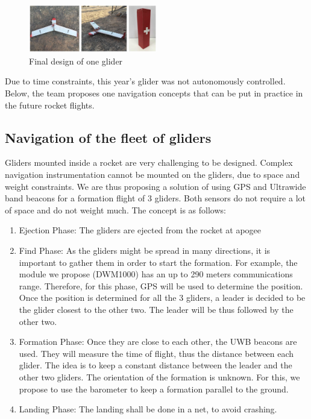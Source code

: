\begin{figure}[h!]
    \centering
        \includegraphics[width=0.5\textwidth]{img/final.jpg}
        \caption{Final design of one glider}
        \label{fig:final}
 \end{figure}

Due to time constraints, this year's glider was not autonomously controlled. Below, the team proposes one navigation concepts that can be put in practice in the future rocket flights.


\subsection{Navigation of the fleet of gliders}
\label{subsection:navcontrol}

Gliders mounted inside a rocket are very challenging to be designed. 
Complex navigation instrumentation cannot be mounted on the gliders, due to space and weight constraints. 
We are thus proposing a solution of using GPS and Ultrawide band beacons for a formation flight of 3 gliders. Both sensors do not require a lot of space and do not weight much.
The concept is as follows:
\begin{enumerate}
    \item Ejection Phase: The gliders are ejected from the rocket at apogee
    \item Find Phase: As the gliders might be spread in many directions, it is important to gather them in order to start the formation. For example, the module we propose (DWM1000) has an up to 290 meters communications range. Therefore, for this phase, GPS will be used to determine the position. Once the position is determined for all the 3 gliders, a leader is decided to be the glider closest to the other two. The leader will be thus followed by the other two.
    \item Formation Phase: Once they are close to each other, the UWB beacons are used. They will measure the time of flight, thus the distance between each glider. The idea is to keep a constant distance between the leader and the other two gliders. The orientation of the formation is unknown. For this, we propose to use the barometer to keep a formation parallel to the ground. 
    \item Landing Phase: The landing shall be done in a net, to avoid crashing.
\end{enumerate}


